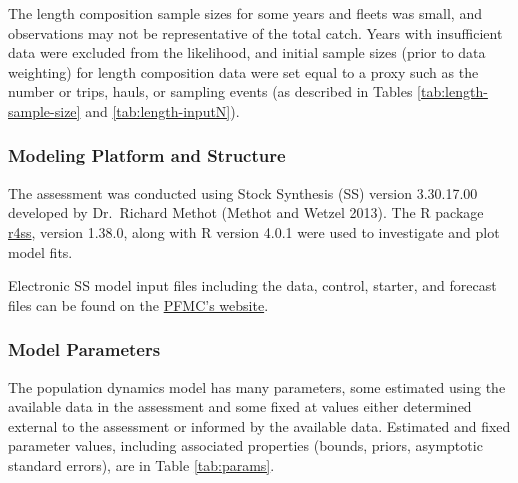 \documentclass[11pt,
  english,
  a4paper,
]{article}
\begin{document}
The length composition sample sizes for some years and fleets was small, and observations may not be representative of the total catch. Years with insufficient data were excluded from the likelihood, and initial sample sizes (prior to data weighting) for length composition data were set equal to a proxy such as the number or trips, hauls, or sampling events (as described in Tables \ref{tab:length-sample-size} and \ref{tab:length-inputN}).


\hypertarget{modeling-platform-and-structure}{%
\subsubsection{Modeling Platform and Structure}\label{modeling-platform-and-structure}}

\leavevmode\tagmcend\tagstructend

The assessment was conducted using Stock Synthesis (SS) version 3.30.17.00 developed by Dr.~Richard Methot {(Methot and Wetzel 2013)\leavevmode\tagmcend\tagstructend}. The R package {\href{https://github.com/r4ss/r4ss}{r4ss}\leavevmode\tagmcend\tagstructend}, version 1.38.0, along with R version 4.0.1 were used to investigate and plot model fits.

Electronic SS model input files including the data, control, starter, and forecast files can be found on the {\href{https://www.pcouncil.org/groundfish/stock-assessments/}{PFMC's website}\leavevmode\tagmcend\tagstructend}.


\hypertarget{model-parameters}{%
\subsubsection{Model Parameters}\label{model-parameters}}

\leavevmode\tagmcend\tagstructend

The population dynamics model has many parameters, some estimated using the available data in the assessment and some fixed at values either determined external to the assessment or informed by the available data. Estimated and fixed parameter values, including associated properties (bounds, priors, asymptotic standard errors), are in Table \ref{tab:params}.
\end{document}
